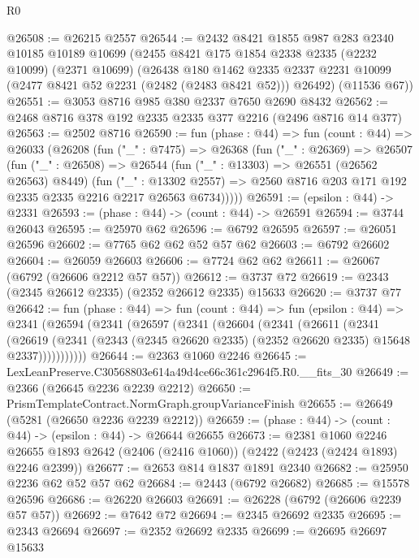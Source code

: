 \begin{lexlean}{R0}
\begin{coremodule}
@26508 := @26215 @2557
@26544 := @2432
    @8421
    @1855
    @987
    @283
    @2340
    @10185
    @10189
    @10699
    (@2455
      @8421
      @175
      @1854
      @2338
      @2335
      (@2232 @10099)
      (@2371 @10699)
      (@26438
        @180
        @1462
        @2335
        @2337
        @2231
        @10099
        (@2477 @8421 @52 @2231 (@2482 (@2483 @8421 @52)))
        @26492)
      (@11536 @67))
@26551 := @3053 @8716 @985 @380 @2337 @7650 @2690 @8432
@26562 := @2468 @8716 @378 @192 @2335 @2335 @377 @2216 (@2496 @8716 @14 @377)
@26563 := @2502 @8716
@26590 := fun (phase : @44) =>
  fun (count : @44) =>
  @26033
    (@26208
      (fun ("_" : @7475) =>
      @26368
        (fun ("_" : @26369) =>
        @26507
          (fun ("_" : @26508) =>
          @26544
            (fun ("_" : @13303) => @26551 (@26562 @26563) @8449)
            (fun ("_" : @13302 @2557) =>
            @2560 @8716 @203 @171 @192 @2335 @2335 @2216 @2217 @26563 @6734)))))
@26591 := (epsilon : @44) -> @2331
@26593 := (phase : @44) -> (count : @44) -> @26591
@26594 := @3744 @26043
@26595 := @25970 @62
@26596 := @6792 @26595
@26597 := @26051 @26596
@26602 := @7765 @62 @62 @52 @57 @62
@26603 := @6792 @26602
@26604 := @26059 @26603
@26606 := @7724 @62 @62
@26611 := @26067 (@6792 (@26606 @2212 @57 @57))
@26612 := @3737 @72
@26619 := @2343 (@2345 @26612 @2335) (@2352 @26612 @2335) @15633
@26620 := @3737 @77
@26642 := fun (phase : @44) =>
  fun (count : @44) =>
  fun (epsilon : @44) =>
  @2341
    (@26594
      (@2341
        (@26597
          (@2341
            (@26604
              (@2341
                (@26611
                  (@2341
                    (@26619
                      (@2341
                        (@2343 (@2345 @26620 @2335) (@2352 @26620 @2335) @15648 @2337)))))))))))
@26644 := @2363 @1060 @2246
@26645 := LexLeanPreserve.C30568803e614a49d4ce66c361c2964f5.R0.__fits_30
@26649 := @2366 (@26645 @2236 @2239 @2212)
@26650 := PrismTemplateContract.NormGraph.groupVarianceFinish
@26655 := @26649 (@5281 (@26650 @2236 @2239 @2212))
@26659 := (phase : @44) -> (count : @44) -> (epsilon : @44) -> @26644 @26655
@26673 := @2381
    @1060
    @2246
    @26655
    @1893
    @2642
    (@2406 (@2416 @1060))
    (@2422 (@2423 (@2424 @1893) @2246 @2399))
@26677 := @2653 @814 @1837 @1891 @2340
@26682 := @25950 @2236 @62 @52 @57 @62
@26684 := @2443 (@6792 @26682)
@26685 := @15578 @26596
@26686 := @26220 @26603
@26691 := @26228 (@6792 (@26606 @2239 @57 @57))
@26692 := @7642 @72
@26694 := @2345 @26692 @2335
@26695 := @2343 @26694
@26697 := @2352 @26692 @2335
@26699 := @26695 @26697 @15633

\end{coremodule}
\end{lexlean}
